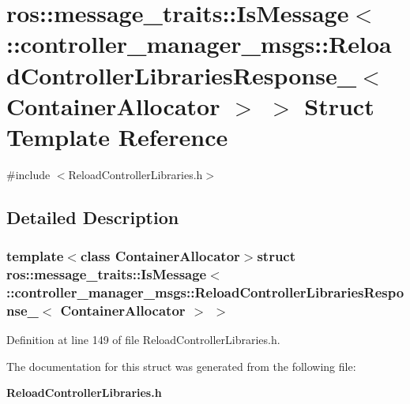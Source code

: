 \section{ros\-:\-:message\-\_\-traits\-:\-:\-Is\-Message$<$ \-:\-:controller\-\_\-manager\-\_\-msgs\-:\-:\-Reload\-Controller\-Libraries\-Response\-\_\-$<$ \-Container\-Allocator $>$ $>$ \-Struct \-Template \-Reference}
\label{structros_1_1message__traits_1_1IsMessage_3_01_1_1controller__manager__msgs_1_1ReloadControllerL41b50effefe3b59319730a3addf3b6ed}


{\ttfamily \#include $<$\-Reload\-Controller\-Libraries.\-h$>$}



\subsection{\-Detailed \-Description}
\subsubsection*{template$<$class Container\-Allocator$>$struct ros\-::message\-\_\-traits\-::\-Is\-Message$<$ \-::controller\-\_\-manager\-\_\-msgs\-::\-Reload\-Controller\-Libraries\-Response\-\_\-$<$ Container\-Allocator $>$ $>$}



\-Definition at line 149 of file \-Reload\-Controller\-Libraries.\-h.



\-The documentation for this struct was generated from the following file\-:\begin{DoxyCompactItemize}
\item 
{\bf \-Reload\-Controller\-Libraries.\-h}\end{DoxyCompactItemize}
